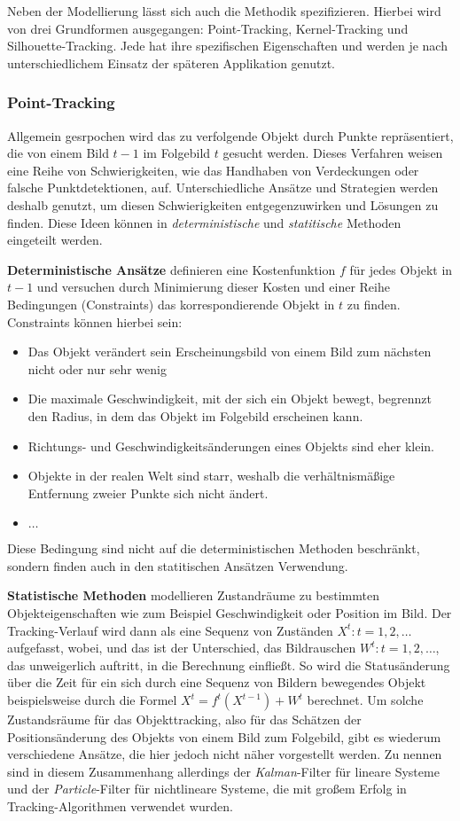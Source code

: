 Neben der Modellierung lässt sich auch die Methodik spezifizieren. Hierbei wird von drei Grundformen ausgegangen: Point-Tracking, Kernel-Tracking und Silhouette-Tracking. Jede hat ihre spezifischen Eigenschaften und werden je nach unterschiedlichem Einsatz der späteren Applikation genutzt.

\subsubsection{Point-Tracking}
Allgemein gesrpochen wird das zu verfolgende Objekt durch Punkte repräsentiert, die von einem Bild $t-1$ im Folgebild $t$ gesucht werden. Dieses Verfahren weisen eine Reihe von Schwierigkeiten, wie das Handhaben von Verdeckungen oder falsche Punktdetektionen, auf. Unterschiedliche Ansätze und Strategien werden deshalb genutzt, um diesen Schwierigkeiten entgegenzuwirken und Lösungen zu finden. Diese Ideen können in \textit{deterministische} und \textit{statitische} Methoden eingeteilt werden. 

{\bf Deterministische Ansätze } definieren eine Kostenfunktion $f$ für jedes Objekt in $t-1$ und versuchen durch Minimierung dieser Kosten und einer Reihe Bedingungen (Constraints) das korrespondierende Objekt in $t$ zu finden. Constraints können hierbei sein:

\begin{itemize}
\item Das Objekt verändert sein Erscheinungsbild von einem Bild zum nächsten nicht oder nur sehr wenig \cite{FPIS}
\item Die maximale Geschwindigkeit, mit der sich ein Objekt bewegt, begrennzt den Radius, in dem das Objekt im Folgebild erscheinen kann.
\item Richtungs- und Geschwindigkeitsänderungen eines Objekts sind eher klein.
\item Objekte in der realen Welt sind starr, weshalb die verhältnismäßige Entfernung zweier Punkte sich nicht ändert.
\item $\dots$
\end{itemize}
Diese Bedingung sind nicht auf die deterministischen Methoden beschränkt, sondern finden auch in den statitischen Ansätzen Verwendung. 

{\bf Statistische Methoden} modellieren Zustandräume zu bestimmten Objekteigenschaften wie zum Beispiel Geschwindigkeit oder Position im Bild. Der Tracking-Verlauf wird dann als eine Sequenz von Zuständen $X^{t}:t=1,2,\dots$ aufgefasst, wobei, und das ist der Unterschied, das Bildrauschen $W^{t}:t=1,2,\dots$, das unweigerlich auftritt, in die Berechnung einfließt. So wird die Statusänderung über die Zeit für ein sich durch eine Sequenz von Bildern bewegendes Objekt beispielsweise durch die Formel $X^{t}=f^{t}(X^{t-1})+W^{t}$ berechnet. Um solche Zustandsräume für das Objekttracking, also für das Schätzen der Positionsänderung des Objekts von einem Bild zum Folgebild, gibt es wiederum verschiedene Ansätze, die hier jedoch nicht näher vorgestellt werden. Zu nennen sind in diesem Zusammenhang allerdings der \textit{Kalman}-Filter\cite{KAF} für lineare Systeme und der \textit{Particle}-Filter \cite{PAF} für nichtlineare Systeme, die mit großem Erfolg in Tracking-Algorithmen verwendet wurden.

